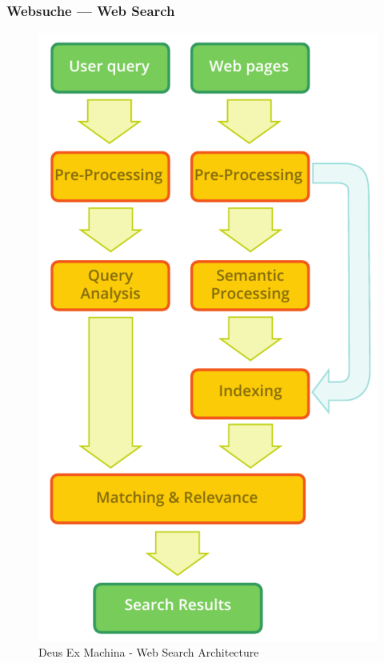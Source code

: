 \documentclass[]{../../metanetpaper}
\begin{document}
\begin{Parallel}[c]{80mm}{80mm}
\clearpage

\subsubsection{Websuche --- Web Search}

\begin{figure}[h!]
\center
\includegraphics[scale=0.6]{../_media/web_search_architecture}\\
\textsf{Deus Ex Machina - Web Search Architecture}
 \end{figure}


\end{Parallel}
\end{document}
